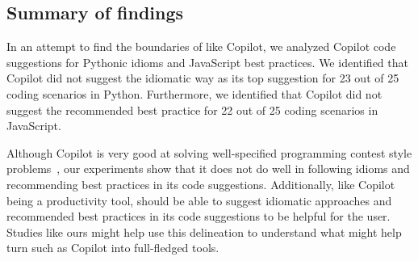 \subsection{Summary of findings}
In an attempt to find the boundaries of \cct{} like Copilot, we analyzed Copilot code suggestions for Pythonic idioms and JavaScript best practices. 
We identified that Copilot did not suggest the idiomatic way as its top suggestion for 23 out of 25 coding scenarios in Python. 
Furthermore, we identified that Copilot did not suggest the recommended best practice for 22 out of 25 coding scenarios in JavaScript.

Although Copilot is very good at solving well-specified programming contest style problems~\cite{empirical_eval}, our experiments show that it does not do well in following idioms and recommending best practices in its code suggestions.
Additionally, \cct{} like Copilot being a productivity tool, should be able to suggest idiomatic approaches and recommended best practices in its code suggestions to be helpful for the user.
Studies like ours might help use this delineation to understand what might help turn \cct{} such as Copilot into full-fledged \AISE{} tools.